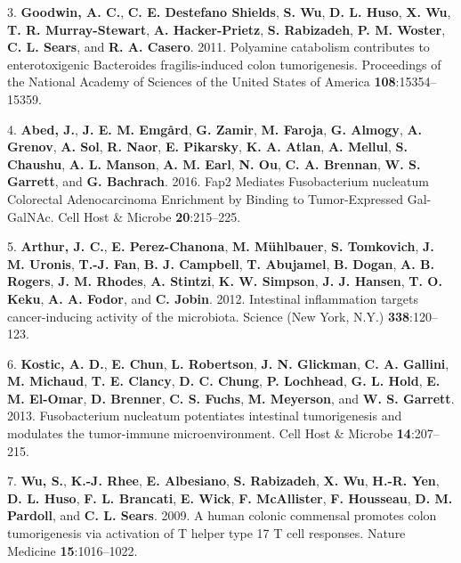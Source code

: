 \documentclass[12pt,]{article}
\begin{document}
\hypertarget{ref-goodwin_polyamine_2011}{}
3. \textbf{Goodwin, A. C.}, \textbf{C. E. Destefano Shields}, \textbf{S.
Wu}, \textbf{D. L. Huso}, \textbf{X. Wu}, \textbf{T. R. Murray-Stewart},
\textbf{A. Hacker-Prietz}, \textbf{S. Rabizadeh}, \textbf{P. M. Woster},
\textbf{C. L. Sears}, and \textbf{R. A. Casero}. 2011. Polyamine
catabolism contributes to enterotoxigenic Bacteroides fragilis-induced
colon tumorigenesis. Proceedings of the National Academy of Sciences of
the United States of America \textbf{108}:15354--15359.

\hypertarget{ref-abed_fap2_2016}{}
4. \textbf{Abed, J.}, \textbf{J. E. M. Emgård}, \textbf{G. Zamir},
\textbf{M. Faroja}, \textbf{G. Almogy}, \textbf{A. Grenov}, \textbf{A.
Sol}, \textbf{R. Naor}, \textbf{E. Pikarsky}, \textbf{K. A. Atlan},
\textbf{A. Mellul}, \textbf{S. Chaushu}, \textbf{A. L. Manson},
\textbf{A. M. Earl}, \textbf{N. Ou}, \textbf{C. A. Brennan}, \textbf{W.
S. Garrett}, and \textbf{G. Bachrach}. 2016. Fap2 Mediates Fusobacterium
nucleatum Colorectal Adenocarcinoma Enrichment by Binding to
Tumor-Expressed Gal-GalNAc. Cell Host \& Microbe \textbf{20}:215--225.

\hypertarget{ref-arthur_intestinal_2012}{}
5. \textbf{Arthur, J. C.}, \textbf{E. Perez-Chanona}, \textbf{M.
Mühlbauer}, \textbf{S. Tomkovich}, \textbf{J. M. Uronis}, \textbf{T.-J.
Fan}, \textbf{B. J. Campbell}, \textbf{T. Abujamel}, \textbf{B. Dogan},
\textbf{A. B. Rogers}, \textbf{J. M. Rhodes}, \textbf{A. Stintzi},
\textbf{K. W. Simpson}, \textbf{J. J. Hansen}, \textbf{T. O. Keku},
\textbf{A. A. Fodor}, and \textbf{C. Jobin}. 2012. Intestinal
inflammation targets cancer-inducing activity of the microbiota. Science
(New York, N.Y.) \textbf{338}:120--123.

\hypertarget{ref-kostic_fusobacterium_2013}{}
6. \textbf{Kostic, A. D.}, \textbf{E. Chun}, \textbf{L. Robertson},
\textbf{J. N. Glickman}, \textbf{C. A. Gallini}, \textbf{M. Michaud},
\textbf{T. E. Clancy}, \textbf{D. C. Chung}, \textbf{P. Lochhead},
\textbf{G. L. Hold}, \textbf{E. M. El-Omar}, \textbf{D. Brenner},
\textbf{C. S. Fuchs}, \textbf{M. Meyerson}, and \textbf{W. S. Garrett}.
2013. Fusobacterium nucleatum potentiates intestinal tumorigenesis and
modulates the tumor-immune microenvironment. Cell Host \& Microbe
\textbf{14}:207--215.

\hypertarget{ref-wu_human_2009}{}
7. \textbf{Wu, S.}, \textbf{K.-J. Rhee}, \textbf{E. Albesiano},
\textbf{S. Rabizadeh}, \textbf{X. Wu}, \textbf{H.-R. Yen}, \textbf{D. L.
Huso}, \textbf{F. L. Brancati}, \textbf{E. Wick}, \textbf{F.
McAllister}, \textbf{F. Housseau}, \textbf{D. M. Pardoll}, and
\textbf{C. L. Sears}. 2009. A human colonic commensal promotes colon
tumorigenesis via activation of T helper type 17 T cell responses.
Nature Medicine \textbf{15}:1016--1022.
\end{document}
